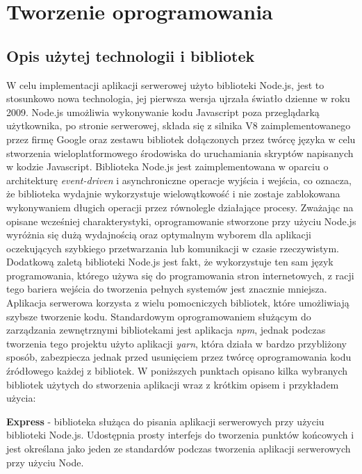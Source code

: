 \chapter{Tworzenie oprogramowania}
\label{cha:tworzenie_oprogramowania}

\section{Opis użytej technologii i bibliotek}

W celu implementacji aplikacji serwerowej użyto biblioteki Node.js, jest to stosunkowo nowa technologia, jej pierwsza wersja ujrzała światło dzienne w roku 2009. Node.js umożliwia wykonywanie kodu Javascript poza przeglądarką użytkownika, po stronie serwerowej, składa się z silnika V8 zaimplementowanego przez firmę Google oraz zestawu bibliotek dołączonych przez twórcę języka w celu stworzenia wieloplatformowego środowiska do uruchamiania skryptów napisanych w kodzie Javascript. Biblioteka Node.js jest zaimplementowana w oparciu o architekturę \textit{event-driven} i asynchroniczne operacje wyjścia i wejścia, co oznacza, że biblioteka wydajnie wykorzystuje wielowątkowość i nie zostaje zablokowana wykonywaniem długich operacji przez równolegle działające procesy. Zważając na opisane wcześniej charakterystyki, oprogramowanie stworzone przy użyciu Node.js wyróżnia się dużą wydajnością oraz optymalnym wyborem dla aplikacji oczekujących szybkiego przetwarzania lub komunikacji w czasie rzeczywistym. Dodatkową zaletą biblioteki Node.js jest fakt, że wykorzystuje ten sam język programowania, którego używa się do programowania stron internetowych, z racji tego bariera wejścia do tworzenia pełnych systemów jest znacznie mniejsza.
Aplikacja serwerowa korzysta z wielu pomocniczych bibliotek, które umożliwiają szybsze tworzenie kodu. Standardowym oprogramowaniem służącym do zarządzania zewnętrznymi bibliotekami jest aplikacja \textit{npm}, jednak podczas tworzenia tego projektu użyto aplikacji \textit{yarn}, która działa w bardzo przybliżony sposób, zabezpiecza jednak przed usunięciem przez twórcę oprogramowania kodu źródłowego każdej z bibliotek. W poniższych punktach opisano kilka wybranych bibliotek użytych do stworzenia aplikacji wraz z krótkim opisem i przykładem użycia:\newline

\textbf{Express} - biblioteka służąca do pisania aplikacji serwerowych przy użyciu biblioteki Node.js. Udostępnia prosty interfejs do tworzenia punktów końcowych i jest określana jako jeden ze standardów podczas tworzenia aplikacji serwerowych przy użyciu Node.\newline

